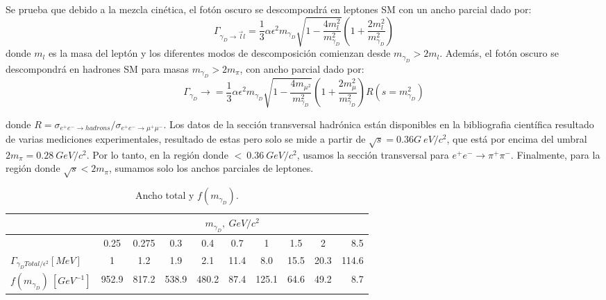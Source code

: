 Se prueba que debido a la mezcla cinética, el fotón oscuro se descompondrá en leptones SM con un ancho parcial dado por:
\begin{equation}
\label{an-15-455:ec4}
\Gamma_{\gamma_D \rightarrow \vec{l}l} = \dfrac{1}{3}\alpha \epsilon^2 m_{\gamma_D} \sqrt{1- \dfrac{4m_l^2}{m_{\gamma_D}^2}}
\left( 1 + \dfrac{2m_l^2}{m_{\gamma_D}^2}\right) 
\end{equation}
donde $m_l$ es la masa del leptón y los diferentes modos de descomposición comienzan desde $m_{\gamma_D} > 2 m_l$. Además, el fotón oscuro se descompondrá en hadrones SM para masas $m_{\gamma_D} > 2 m_\pi$, con ancho parcial dado por:
\begin{equation}
\label{an-15-455:ec5}
\Gamma_{\gamma_D} \rightarrow = \dfrac{1}{3} \alpha \epsilon^2 m_{\gamma_D} \sqrt{1 -\dfrac{4 m_{\mu^2}}{m_{\gamma_D}^2}} \left( 1 + \dfrac{2 m_\mu^2}{m_{\gamma_D}^2}\right) R(s = m_{\gamma_D}^2)
\end{equation}

donde $R = \sigma_{e^+ e^- \rightarrow hadrons} / \sigma_{e^+ e^- \rightarrow \mu^+ \mu^-}$. Los datos de la sección transversal hadrónica están disponibles en la bibliografia científica resultado de varias mediciones experimentales, resultado de estas pero solo se mide a partir de $\sqrt{s}= 0.36G ~ eV / c^2$, que está por encima del umbral $2 m_\pi = 0.28~GeV / c^2$. Por lo tanto, en la región donde $ < ~ 0.36~GeV / c^2$, usamos la sección transversal para $e^+e^- \rightarrow \pi^+\pi^-$. Finalmente, para la región donde $\sqrt{s} < 2 m_\pi$, sumamos solo los anchos parciales de leptones.

\begin{table}[h!]
  \begin{center}
   \caption{Ancho total y $f(m_{\gamma_D})$.}
    \label{an-15-455:tb1}
    \begin{tabular}{|l|c|c|c|c|c|c|c|c|r|} %
		\hline 		
		&\multicolumn{9}{c|}{$m_{\gamma_D}, ~GeV/c^2$}\\		
		\hline 
		&0.25 & 0.275 & 0.3 & 0.4 & 0.7 & 1 & 1.5 & 2 & 8.5\\
		\hline       
       	$\Gamma_{\gamma_D Total/\epsilon^2}[MeV]$ & 1 & 1.2 & 1.9 & 2.1 & 11.4 & 8.0 & 15.5 & 20.3 & 114.6 \\
       	\hline 
       	$f(m_{\gamma_D})~[GeV^{-1}]$ & 952.9 & 817.2 & 538.9 & 480.2 & 87.4 & 125.1 & 64.6 & 49.2 & 8.7 \\
      	\hline      
    \end{tabular}
  \end{center}
\end{table}

